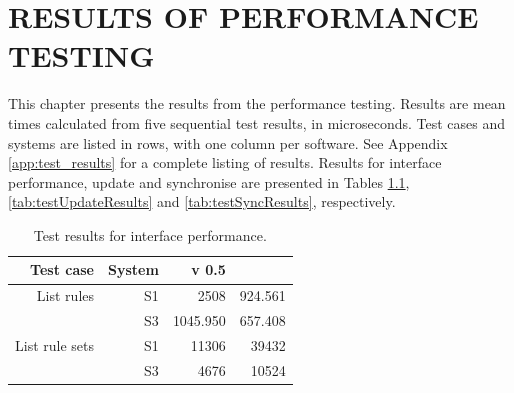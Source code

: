 \chapter{RESULTS OF PERFORMANCE TESTING}
\label{chap:results}
This chapter presents the results from the performance testing. Results are mean
times calculated from five sequential test results, in microseconds. Test
cases and systems are listed in rows, with one column per software. See Appendix
\ref{app:test_results} for a complete listing of results. Results for interface performance,
update and synchronise are presented in Tables \ref{tab:testInterfaceResults}, \ref{tab:testUpdateResults} and \ref{tab:testSyncResults}, respectively.

\renewcommand{\arraystretch}{1.5}
\begin{table}[h]
  \centering
  \begin{tabular}{r|r|r|r}
	Test case & System & \snowman{} v 0.5 & \bhtb{} \\
\hline
List rules & S1 & 2508 & 924.561 \\
 & S3 & 1045.950 & 657.408\\
\hline
List rule sets & S1 & 11306 & 39432 \\
 & S3 & 4676 & 10524 \\
\hline
  \end{tabular}
  \caption{Test results for interface performance.}
  \label{tab:testInterfaceResults}
\end{table}

